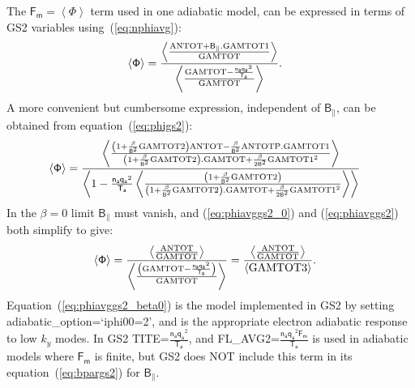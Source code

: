 \documentclass[10pt,a4paper]{article}
\newcommand{\g}[1]{\mathsf{#1}}
\newcommand{\flav}[1]{\left\langle{#1}\right\rangle}
\begin{document}
The $\g{F_m}= \flav{\Phi}$ term used in one adiabatic model, can be expressed
in terms of GS2 variables using~(\ref{eq:nphiavg}):
\begin{align}
  \flav{\g{\Phi}} & = \frac{\flav{ \frac{ {\rm ANTOT} + \g{B_{\parallel}}.{\rm
          GAMTOT1} } {{\rm GAMTOT} }}} {\flav{ \frac{ {\rm GAMTOT
          -\frac{\g{n_a} \g{q_a}^2}{\g{T_a}} }}{{\rm
          GAMTOT}}}} \label{eq:phiavggs2_0}.
\end{align}
A more convenient but cumbersome expression, independent of
$\g{B_{\parallel}}$, can be obtained from equation~(\ref{eq:phigs2}):
\begin{align}
  \flav{\g{\Phi}} & = \frac{\flav{\frac{\left( 1 + \frac{\g{\beta}}{\g{B}^2}
          {\rm GAMTOT2} \right) {\rm ANTOT} - \frac{\g{\beta}}{\g{B}^2} {\rm
          ANTOTP}.{\rm GAMTOT1}} {\left( 1 + \frac{\g{\beta}}{\g{B}^2} {\rm
            GAMTOT2} \right).{\rm GAMTOT} + \frac{\g{\beta}}{2\g{B}^2} {\rm
          GAMTOT1}^2}}} {\flav{1 - \frac{\g{n_a} \g{q_a}^2}{\g{T_a}}
      \flav{\frac{\left( 1 + \frac{\g{\beta}}{\g{B}^2} {\rm GAMTOT2} \right)}
        {\left( 1 + \frac{\g{\beta}}{\g{B}^2} {\rm GAMTOT2} \right).{\rm
            GAMTOT} + \frac{\g{\beta}}{2\g{B}^2} {\rm GAMTOT1}^2}} }}
\label{eq:phiavggs2}
\end{align}
In the $\g{\beta}=0$ limit $\g{B_{\parallel}}$ must vanish, and
(\ref{eq:phiavggs2_0}) and (\ref{eq:phiavggs2}) both simplify to give:
\begin{align}
  \flav{\g{\Phi}} & = \frac{\flav{ \frac{ {\rm ANTOT}}{{\rm GAMTOT}}}} {\flav{
      \frac{\left( {\rm GAMTOT} - \frac{\g{n_a} \g{q_a}^2}{\g{T_a}} \right)
      }{{\rm GAMTOT}}}} = \frac{\flav{ \frac{ {\rm ANTOT}}{{\rm GAMTOT}}}}
  {\flav{ {\rm GAMTOT3}}}
 \label{eq:phiavggs2_beta0}.
\end{align}
Equation~(\ref{eq:phiavggs2_beta0}) is the model implemented in GS2 by setting
adiabatic\_option=`iphi00=2', and is the appropriate electron adiabatic
response to low $k_y$ modes.  In GS2 TITE=$\frac{\g{n_a} \g{q_a}^2}{\g{T_a}}$,
and FL\_AVG2=$\frac{\g{n_a} \g{q_a}^2 \g{F_m}}{\g{T_a}}$ is used in adiabatic
models where $\g{F_m}$ is finite, but GS2 does NOT include this term in its
equation~(\ref{eq:bpargs2}) for $\g{B_{\parallel}}$.
\end{document}
